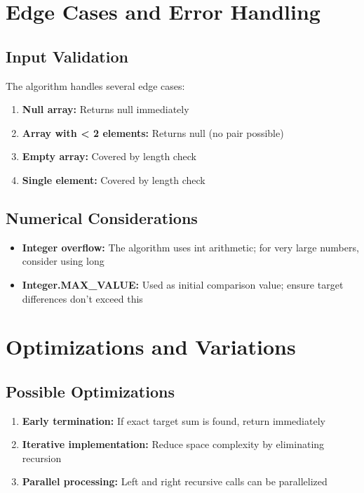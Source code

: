 \documentclass[12pt,a4paper]{article}
\begin{document}
\section{Edge Cases and Error Handling}

\subsection{Input Validation}

The algorithm handles several edge cases:

\begin{enumerate}
    \item \textbf{Null array:} Returns null immediately
    \item \textbf{Array with < 2 elements:} Returns null (no pair possible)
    \item \textbf{Empty array:} Covered by length check
    \item \textbf{Single element:} Covered by length check
\end{enumerate}

\subsection{Numerical Considerations}

\begin{itemize}
    \item \textbf{Integer overflow:} The algorithm uses int arithmetic; for very large numbers, consider using long
    \item \textbf{Integer.MAX_VALUE:} Used as initial comparison value; ensure target differences don't exceed this
\end{itemize}

\section{Optimizations and Variations}

\subsection{Possible Optimizations}

\begin{enumerate}
    \item \textbf{Early termination:} If exact target sum is found, return immediately
    \item \textbf{Iterative implementation:} Reduce space complexity by eliminating recursion
    \item \textbf{Parallel processing:} Left and right recursive calls can be parallelized
\end{enumerate}
\end{document}
